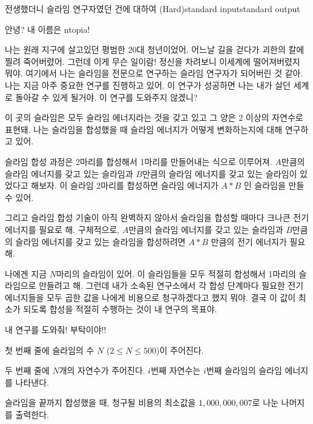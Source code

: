\begin{problem}{전생했더니 슬라임 연구자였던 건에 대하여 (Hard)}{standard input}{standard output}

안녕? 내 이름은 ntopia!

나는 원래 지구에 살고있던 평범한 20대 청년이었어. 어느날 길을 걷다가 괴한의 칼에 찔려
죽어버렸어. 그런데 이게 무슨 일이람! 정신을 차려보니 이세계에 떨어져버렸지 뭐야.
여기에서 나는 슬라임을 전문으로 연구하는 슬라임 연구자가 되어버린 것 같아.
나는 지금 아주 중요한 연구를 진행하고 있어. 이 연구가 성공하면 나는 내가 살던 세계로
돌아갈 수 있게 될거야. 이 연구를 도와주지 않겠니?

이 곳의 슬라임은 모두 슬라임 에너지라는 것을 갖고 있고 그 양은 2 이상의 자연수로 표현돼.
나는 슬라임을 합성했을 때 슬라임 에너지가 어떻게 변화하는지에 대해 연구하고 있어.

슬라임 합성 과정은 2마리를 합성해서 1마리를 만들어내는 식으로 이루어져.
$A$만큼의 슬라임 에너지를 갖고 있는 슬라임과 $B$만큼의 슬라임 에너지를 갖고 있는
슬라임이 있었다고 해보자. 이 슬라임 2마리를 합성하면
슬라임 에너지가 $A * B$ 인 슬라임을 만들 수 있어.

그리고 슬라임 합성 기술이 아직 완벽하지 않아서 슬라임을 합성할 때마다
크나큰 전기 에너지를 필요로 해. 구체적으로,
$A$만큼의 슬라임 에너지를 갖고 있는 슬라임과 $B$만큼의 슬라임 에너지를 갖고 있는 슬라임을
합성하려면 $A * B$ 만큼의 전기 에너지가 필요해.

나에겐 지금 $N$마리의 슬라임이 있어. 이 슬라임들을 모두 적절히 합성해서
1마리의 슬라임으로 만들려고 해. 그런데 내가 소속된 연구소에서
각 합성 단계마다 필요한 전기 에너지들을 모두 곱한 값을 나에게 비용으로
청구하겠다고 했지 뭐야. 결국 이 값이 최소가 되도록 합성을 적절히 수행하는 것이 내 연구의 목표야.

내 연구를 도와줘! 부탁이야!!

\InputFile
첫 번째 줄에 슬라임의 수 $N$ ($2 \le N \le 500$)이 주어진다.

두 번째 줄에 $N$개의 자연수가 주어진다. $i$번째 자연수는 $i$번째 슬라임의 슬라임 에너지를 나타낸다.

\OutputFile
슬라임을 끝까지 합성했을 때, 청구될 비용의 최소값을 $1,000,000,007$로 나눈 나머지를 출력한다.

\Example

\begin{example}
%
\end{example}

\end{problem}
